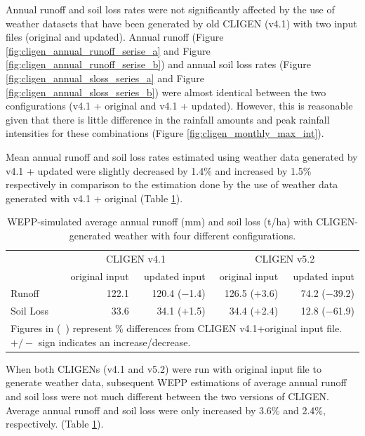 Annual runoff and soil loss rates were not significantly affected by the use of
weather datasets that have been generated by old CLIGEN (v4.1) with two input
files (original and updated). Annual runoff (Figure
\ref{fig:cligen_annual_runoff_serise_a} and Figure
\ref{fig:cligen_annual_runoff_serise_b}) and annual soil loss rates (Figure
\ref{fig:cligen_annual_sloss_series_a} and Figure
\ref{fig:cligen_annual_sloss_series_b}) were almost identical between the two
configurations (v4.1 + original and v4.1 + updated). However, this is reasonable
given that there is little difference in the rainfall amounts and peak rainfall
intensities for these combinations (Figure \ref{fig:cligen_monthly_max_int}).

Mean annual runoff and soil
loss rates estimated using weather data generated by v4.1 + updated were
slightly decreased by 1.4\% and increased by 1.5\% respectively in comparison to
the estimation done by the use of weather data generated with v4.1 + original
(Table \ref{tab:SimualtedAnnualRunoffAndSoilLossWithDifferentConfiguration}).

\begin{table}[htbp]
  \centering
  \caption[WEPP-simulated average annual runoff and soil loss]{WEPP-simulated
average annual runoff (mm) and soil loss (t/ha) with CLIGEN-generated
weather with four different configurations.}
  \label{tab:SimualtedAnnualRunoffAndSoilLossWithDifferentConfiguration}
    \begin{tabular}{lrrrr}
      \toprule
       & \multicolumn{2}{c}{CLIGEN v4.1} &
\multicolumn{2}{c}{CLIGEN v5.2}\\
      \cmidrule(r){2-3}\cmidrule(l){4-5}
       & original input & updated input & original input &
updated input \\
      \midrule
      Runoff & 122.1 & 120.4 ($-$1.4) & 126.5 ($+$3.6) & 74.2 ($-$39.2)\\
      Soil Loss & 33.6 & 34.1 ($+$1.5) & 34.4 ($+$2.4) & 12.8 ($-$61.9)\\
      \bottomrule
      \multicolumn{5}{p{10.5cm}}{\footnotesize Figures in (\ )
represent \% differences from CLIGEN v4.1+original input file. $+/-$ sign
indicates an increase/decrease.}
    \end{tabular}
\end{table}

When both CLIGENs (v4.1 and v5.2) were run with original input file to generate
weather data, subsequent WEPP estimations of average annual runoff and soil loss
were not much different between the two versions of CLIGEN. Average annual
runoff and soil loss were only increased by 3.6\% and 2.4\%, respectively.
(Table \ref{tab:SimualtedAnnualRunoffAndSoilLossWithDifferentConfiguration}).


